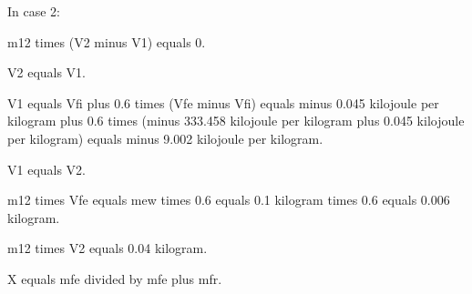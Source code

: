 In case 2:

m12 times (V2 minus V1) equals 0.

V2 equals V1.

V1 equals Vfi plus 0.6 times (Vfe minus Vfi) equals minus 0.045 kilojoule per kilogram plus 0.6 times (minus 333.458 kilojoule per kilogram plus 0.045 kilojoule per kilogram) equals minus 9.002 kilojoule per kilogram.

V1 equals V2.

m12 times Vfe equals mew times 0.6 equals 0.1 kilogram times 0.6 equals 0.006 kilogram.

m12 times V2 equals 0.04 kilogram.

X equals mfe divided by mfe plus mfr.